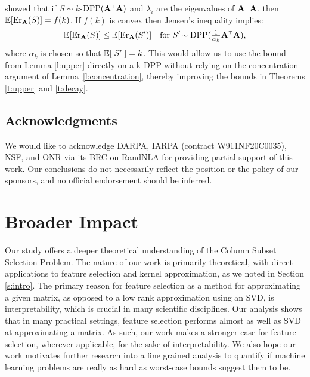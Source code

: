 \documentclass{article}
\begin{document}
\citet{pca-volume-sampling} showed that if $S\sim
k$-$\DPP(\A^\top\A)$ and $\lambda_i$ are the eigenvalues of
$\A^\top\A$, then $\mathbb E[\mathrm{Er}_\mathbf A(S)]=f(k)$. If $f(k)$ is convex then
Jensen's inequality implies:
\begin{align*}
  \E[\Er_\A(S)]\leq \E[\Er_\A(S')]\quad\text{for }S'\!\sim\DPP(\tfrac1{\alpha_k}\A^\top\A),
\end{align*}
where $\alpha_k$ is chosen so that $\mathbb E[|S'|]=k$. This would allow us to use
the bound from Lemma \ref{l:upper} directly on a k-DPP
without relying on the concentration argument of
Lemma~\ref{l:concentration}, thereby improving the bounds in
Theorems \ref{t:upper} and \ref{t:decay}.


\subsection*{Acknowledgments}
We would like to acknowledge DARPA, IARPA (contract W911NF20C0035),
NSF, and ONR via its BRC on RandNLA for providing partial support of
this work.  Our conclusions do not necessarily reflect the position or
the policy of our sponsors, and no official endorsement should be
inferred.

\ifisarxiv\else
\section*{Broader Impact}
Our study offers a deeper theoretical understanding of the Column
Subset Selection Problem. The nature of our work is primarily
theoretical, with direct applications to feature selection and kernel
approximation, as we noted in Section \ref{s:intro}. The primary reason for
feature selection as a method for approximating a given matrix, as opposed to a low rank
approximation using an SVD, is interpretability, which is crucial in
many scientific disciplines. Our analysis shows that in many practical settings, feature
selection performs almost as well as SVD at approximating a matrix. As
such, our work makes a stronger case for feature selection, wherever
applicable, for the sake of interpretability. We also hope our work
motivates further research into a fine grained analysis to quantify if
machine learning problems are really as hard as worst-case bounds
suggest them to be.
\fi




  \newpage
  \appendix
  \onecolumn
  
  
\end{document}
